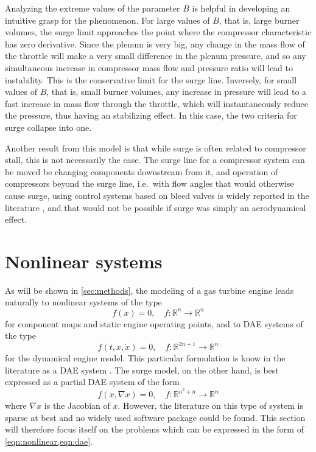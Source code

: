 \documentclass[tcc]{subfiles}
\begin{document}
Analyzing the extreme values of the parameter $B$ is helpful in developing an intuitive grasp for the phenomenon.
For large values of $B$, that is, large burner volumes, the surge limit approaches the point where the compressor characteristic has zero derivative. Since the plenum is very big, any change in the mass flow of the throttle will make a very small difference in the plenum pressure, and so any simultaneous increase in compressor mass flow and pressure ratio will lead to instability. This is the conservative limit for the surge line.
Inversely, for small values of $B$, that is, small burner volumes, any increase in pressure will lead to a fast increase in mass flow through the throttle, which will instantaneously reduce the pressure, thus having an stabilizing effect. 
In this case, the two criteria for surge collapse into one.

Another result from this model is that while surge is often related to compressor stall, this is not necessarily the case.
The surge line for a compressor system can be moved be changing components downstream from it, and operation of compressors beyond the surge line, i.e.\ with flow angles that would otherwise cause surge, using control systems based on bleed valves is widely reported in the literature \cite[e.g.][]{Liaw2004}, and that would not be possible if surge was simply an aerodynamical effect.

\section{Nonlinear systems}
\label{sec:review:numeric}

As will be shown in \cref{sec:methods}, the modeling of a gas turbine engine leads naturally to nonlinear systems of the type 
\begin{equation}
    \label{eqn:nonlinear}
    f(x) = 0, \quad f:\mathbb{R}^n \rightarrow \mathbb{R}^n
\end{equation}
for component maps and static engine operating points, and to \acl{DAE} systems of the type
\begin{equation}
    \label{eqn:dae}
    f(t, x, \dot{x}) = 0, \quad f:\mathbb{R}^{2n+1} \rightarrow \mathbb{R}^n
\end{equation}
for the dynamical engine model. 
This particular formulation is know in the literature as a \ac{DAE} system \cite{Brenan1995}.
The surge model, on the other hand, is best expressed as a partial \acl{DAE} system of the form
\begin{equation}
    f(x, \nabla x) = 0, \quad f:\mathbb{R}^{n^2+n} \rightarrow \mathbb{R}^n
\end{equation}
where $\nabla x$ is the Jacobian of $x$. 
However, the literature on this type of system is sparse at best and no widely used software package could be found.
This section will therefore focus itself on the problems which can be expressed in the form of \cref{eqn:nonlinear,eqn:dae}.
\end{document}
